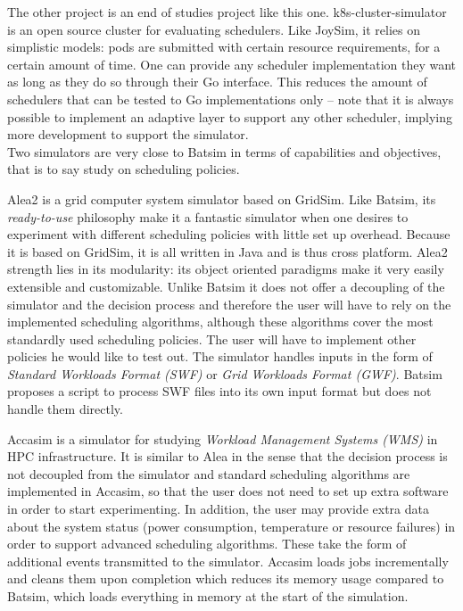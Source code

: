 The other project is an end of studies project like this one.
k8s-cluster-simulator\cite{k8s-cluster-simulator} is an open source cluster for
evaluating schedulers. Like JoySim, it relies on simplistic models: pods are
submitted with certain resource requirements, for a certain amount of time. One
can provide any scheduler implementation they want as long as they do so
through their Go interface. This reduces the amount of schedulers that can be
tested to Go implementations only -- note that it is always possible to
implement an adaptive layer to support any other scheduler, implying more
development to support the simulator.\\

Two simulators are very close to Batsim in terms of capabilities and
objectives, that is to say study on scheduling policies.

Alea2\cite{alea2} is a grid computer system simulator based on GridSim. Like
Batsim, its \textit{ready-to-use} philosophy make it a fantastic simulator when
one desires to experiment with different scheduling policies with little set up
overhead. Because it is based on GridSim, it is all written in Java and is thus
cross platform. Alea2 strength lies in its modularity: its object oriented
paradigms make it very easily extensible and customizable. Unlike Batsim it
does not offer a decoupling of the simulator and the decision process and
therefore the user will have to rely on the implemented scheduling algorithms,
although these algorithms cover the most standardly used scheduling policies.
The user will have to implement other policies he would like to test out. The
simulator handles inputs in the form of \textit{Standard Workloads Format
(SWF)} or \textit{Grid Workloads Format (GWF)}. Batsim proposes a script to
process SWF files into its own input format but does not handle them directly.

Accasim\cite{10.1007/978-3-319-73353-1_12} is a simulator for studying
\textit{Workload Management Systems (WMS)} in HPC infrastructure. It is similar
to Alea in the sense that the decision process is not decoupled from the
simulator and standard scheduling algorithms are implemented in Accasim, so
that the user does not need to set up extra software in order to start
experimenting. In addition, the user may provide extra data about the system
status (power consumption, temperature or resource failures) in order to
support advanced scheduling algorithms.  These take the form of additional
events transmitted to the simulator. Accasim loads jobs incrementally and
cleans them upon completion which reduces its memory usage compared to Batsim,
which loads everything in memory at the start of the simulation.

